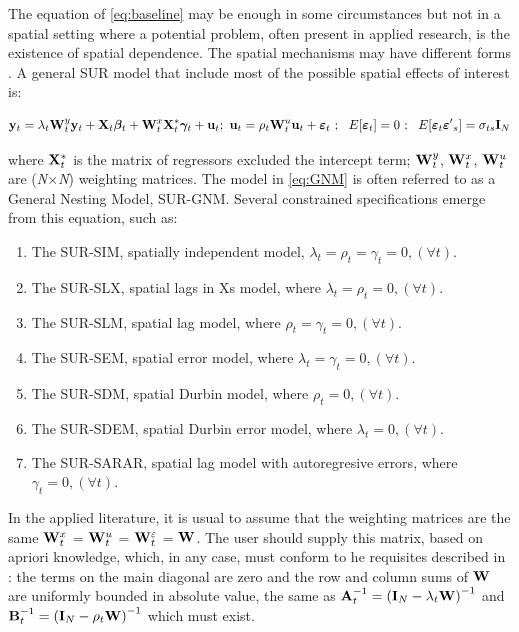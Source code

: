 \documentclass[article]{jss}
\providecommand{\tightlist}{%
  \setlength{\itemsep}{0pt}\setlength{\parskip}{0pt}}
\begin{document}
The equation of \eqref{eq:baseline} may be enough in some circumstances but not in a spatial setting where a potential problem, often present in applied research, is the existence of spatial dependence. The spatial mechanisms may have different forms \citep{Elhorst2014}. A general SUR model that include most of the possible spatial effects of interest is:

\begin{equation}
{\bf y}_t=\lambda_t {\bf W}_t^y {\bf y}_t+ {\bf X}_t {\boldsymbol \beta}_t+ {\bf W}_t^x {\bf X}_t^* {\boldsymbol \gamma}_t + {\bf u}_t;\ {\bf u}_t=\rho_t {\bf W}_t^u {\bf u}_t +{\boldsymbol \varepsilon}_t\ ; \ \  E[{\boldsymbol \varepsilon}_t]=0\ ;\ \ E[{{\boldsymbol \varepsilon}_t} {{\boldsymbol \varepsilon'}_s}]=\sigma_{ts}{\bf I}_N
 \label{eq:GNM}
\end{equation}

where \({\bf X}_t^*\) is the matrix of regressors excluded the intercept term; \({\bf W}_t^y\), \({\bf W}_t^x\), \({\bf W}_t^u\) are (\emph{N}\(\times\)\emph{N}) weighting matrices. The model in \eqref{eq:GNM} is often referred to as a General Nesting Model, SUR-GNM. Several constrained specifications emerge from this equation, such as:

\begin{enumerate}
\def\labelenumi{\arabic{enumi}.}
\tightlist
\item
  The SUR-SIM, spatially independent model, \(\lambda_t = \rho_t = \gamma_t = 0, (\forall t)\).
\item
  The SUR-SLX, spatial lags in Xs model, where \(\lambda_t = \rho_t = 0, (\forall t)\).
\item
  The SUR-SLM, spatial lag model, where \(\rho_t=\gamma_t = 0, (\forall t)\).
\item
  The SUR-SEM, spatial error model, where \(\lambda_t=\gamma_t = 0, (\forall t)\).
\item
  The SUR-SDM, spatial Durbin model, where \(\rho_t = 0, (\forall t)\).
\item
  The SUR-SDEM, spatial Durbin error model, where \(\lambda_t= 0, (\forall t)\).
\item
  The SUR-SARAR, spatial lag model with autoregresive errors, where \(\gamma_t = 0, (\forall t)\).
\end{enumerate}

In the applied literature, it is usual to assume that the weighting matrices are the same \({\bf W}_t^x\) = \({\bf W}_t^u\) = \({\bf W}_t^{\varepsilon}\) = \({\bf W}\). The user should supply this matrix, based on apriori knowledge, which, in any case, must conform to he requisites described in \citet{Kelejian2004}: the terms on the main diagonal are zero and the row and column sums of \(\textbf W\) are uniformly bounded in absolute value, the same as \(\textbf A_{t}^{-1} =\mathop{\left({\bf I}_N -\lambda _{t} {\bf W}\right)}\nolimits^{-1}\) and \(\textbf B_{t}^{-1} =\mathop{\left({\bf I}_N -\rho _{t} {\bf W}\right)}\nolimits^{-1}\) which must exist.
\end{document}
